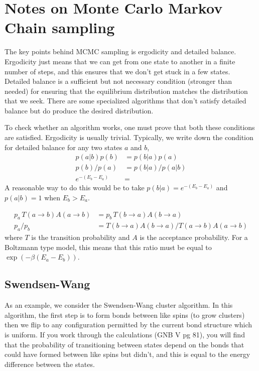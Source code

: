 \documentclass[11pt]{amsart}
\begin{document}
\section{Notes on Monte Carlo Markov Chain sampling}
The key points behind MCMC sampling is ergodicity and detailed balance. Ergodicity just means that we can get from one state to another in a finite number of steps, and this ensures that we don't get stuck in a few states. Detailed balance is a sufficient but not necessary condition (stronger than needed) for ensuring that the equilibrium distribution matches the distribution that we seek. There are some specialized algorithms that don't satisfy detailed balance but do produce the desired distribution.

To check whether an algorithm works, one must prove that both these conditions are satisfied. Ergodicity is usually trivial. Typically, we write down the condition for detailed balance for any two states $a$ and $b$,
\begin{align}
	p(a|b)p(b) &= p(b|a)p(a) \\
	p(b)/p(a) &= p(b|a)/p(a|b) \\
	e^{-(E_b-E_a)} &= 
\end{align}
A reasonable way to do this would be to take $p(b|a) = e^{-(E_b-E_a)}$ and $p(a|b) = 1$ when $E_b>E_a$.

\begin{align}
	p_a\,T(a\rightarrow b)A(a\rightarrow b) &= p_b\,T(b\rightarrow a)A(b\rightarrow a)\\
	p_a/p_b &= T(b\rightarrow a)A(b\rightarrow a)/T(a\rightarrow b)A(a\rightarrow b)
\end{align}
where $T$ is the transition probability and $A$ is the acceptance probability. For a Boltzmann type model, this means that this ratio must be equal to $\exp(-\beta(E_a-E_b))$.

\subsection{Swendsen-Wang}
As an example, we consider the Swendsen-Wang cluster algorithm. In this algorithm, the first step is to form bonds between like spins (to grow clusters) then we flip to any configuration permitted by the current bond structure which is uniform. If you work through the calculations (GNB V pg 81), you will find that the probability of transitioning between states depend on the bonds that could have formed between like spins but didn't, and this is equal to the energy difference between the states.
\end{document}
